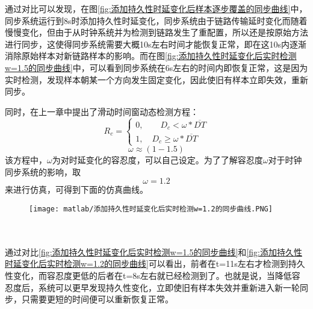通过对比可以发现，在图\ref{fig:添加持久性时延变化后样本逐步覆盖的同步曲线}中，同步系统运行到8s时添加持久性时延变化，同步系统由于链路传输延时变化而随着慢慢变化，但由于从时钟系统并为检测到链路发生了重配置，所以还是按原始方法进行同步，这使得同步系统需要大概10s左右时间才能恢复正常，即在这10s内逐渐消除原始样本对新链路样本的影响。而在图\ref{fig:添加持久性时延变化后实时检测w=1.5的同步曲线}中，可以看到同步系统在6s左右的时间内即恢复正常，这是因为实时检测，发现样本朝某一个方向发生固定变化，因此使旧有样本立即失效，重新同步。

同时，在上一章中提出了滑动时间窗动态检测方程：
\begin{equation}
R_{c} = \left\{
  \begin{array}{ll} %
    0, \qquad D_{c} < \omega * \overline{DT} \\
    1, \quad D_{c} \geq \omega * \overline{DT} 
  \end{array}
  \right. 
\end{equation}
\begin{equation}
  \omega \approx (1 - 1.5)
\end{equation}
该方程中，$\omega$为对时延变化的容忍度，可以自己设定。为了了解容忍度$\omega$对于时钟同步系统的影响，取
\begin{equation}
  \omega = 1.2
\end{equation}
来进行仿真，可得到下面的仿真曲线。
\begin{figure}[htbp]
  \centering
  \begin{minipage}[b]{1\textwidth}
    \captionstyle{\centering}
    \centering
    \texttt{[image: matlab/添加持久性时延变化后实时检测w=1.2的同步曲线.PNG]}
  \end{minipage}     
\end{figure}
\\ \\

通过对比\ref{fig:添加持久性时延变化后实时检测w=1.5的同步曲线}和\ref{fig:添加持久性时延变化后实时检测w=1.2的同步曲线}可以看出，前者在t=11s左右才检测到持久性变化，而容忍度更低的后者在t=8s左右就已经检测到了。也就是说，当降低容忍度后，系统可以更早发现持久性变化，立即使旧有样本失效并重新进入新一轮同步，只需要更短的时间便可以重新恢复正常。


